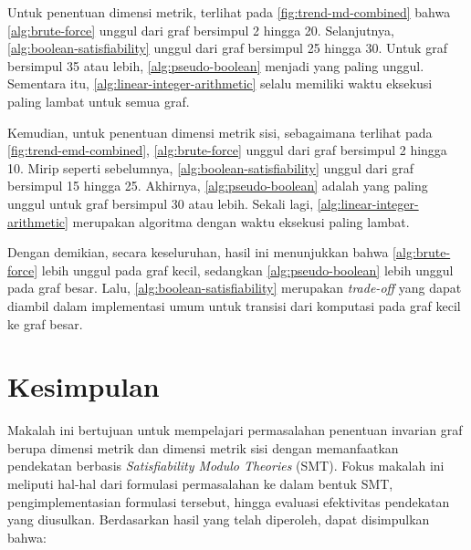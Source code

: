 \documentclass[10pt,twocolumn]{article}
\newcommand{\foreign}[1]{\foreignlanguage{english}{\textit{#1}}}
\newcommand{\minipagewidth}{\linewidth}
\begin{document}
Untuk penentuan dimensi metrik, terlihat pada \autoref{fig:trend-md-combined} bahwa \autoref{alg:brute-force} unggul dari graf bersimpul 2 hingga 20. Selanjutnya, \autoref{alg:boolean-satisfiability} unggul dari graf bersimpul 25 hingga 30. Untuk graf bersimpul 35 atau lebih, \autoref{alg:pseudo-boolean} menjadi yang paling unggul. Sementara itu, \autoref{alg:linear-integer-arithmetic} selalu memiliki waktu eksekusi paling lambat untuk semua graf.

Kemudian, untuk penentuan dimensi metrik sisi, sebagaimana terlihat pada \autoref{fig:trend-emd-combined}, \autoref{alg:brute-force} unggul dari graf bersimpul 2 hingga 10. Mirip seperti sebelumnya, \autoref{alg:boolean-satisfiability} unggul dari graf bersimpul 15 hingga 25. Akhirnya, \autoref{alg:pseudo-boolean} adalah yang paling unggul untuk graf bersimpul 30 atau lebih. Sekali lagi, \autoref{alg:linear-integer-arithmetic} merupakan algoritma dengan waktu eksekusi paling lambat.

\begin{center}
	\renewcommand{\minipagewidth}{0.9\linewidth}

	

	\vspace{1em}

	
\end{center}

Dengan demikian, secara keseluruhan, hasil ini menunjukkan bahwa \autoref{alg:brute-force} lebih unggul pada graf kecil, sedangkan \autoref{alg:pseudo-boolean} lebih unggul pada graf besar. Lalu, \autoref{alg:boolean-satisfiability} merupakan \foreign{trade-off} yang dapat diambil dalam implementasi umum untuk transisi dari komputasi pada graf kecil ke graf besar.

\section{Kesimpulan}

Makalah ini bertujuan untuk mempelajari permasalahan penentuan invarian graf berupa dimensi metrik dan dimensi metrik sisi dengan memanfaatkan pendekatan berbasis \foreign{Satisfiability Modulo Theories} (SMT). Fokus makalah ini meliputi hal-hal dari formulasi permasalahan ke dalam bentuk SMT, pengimplementasian formulasi tersebut, hingga evaluasi efektivitas pendekatan yang diusulkan. Berdasarkan hasil yang telah diperoleh, dapat disimpulkan bahwa:
\end{document}
